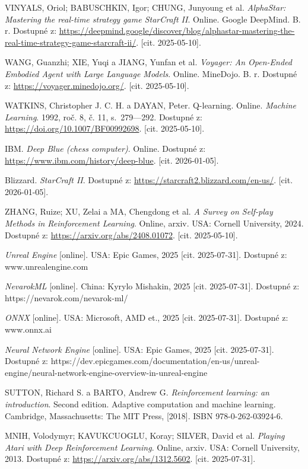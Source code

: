 VINYALS, Oriol; BABUSCHKIN, Igor; CHUNG, Junyoung et al. \textit{AlphaStar: Mastering the real-time strategy game StarCraft II}. Online. Google DeepMind. B. r. Dostupné z: \url{https://deepmind.google/discover/blog/alphastar-mastering-the-real-time-strategy-game-starcraft-ii/}. [cit. 2025-05-10].

WANG, Guanzhi; XIE, Yuqi a JIANG, Yunfan et al. \textit{Voyager: An Open-Ended Embodied Agent with Large Language Models}. Online. MineDojo. B. r. Dostupné z: \url{https://voyager.minedojo.org/}. [cit. 2025-05-10].

WATKINS, Christopher J. C. H. a DAYAN, Peter. Q-learning. Online. \textit{Machine Learning}. 1992, roč. 8, č. 11, s.~279---292. Dostupné z: \url{https://doi.org/10.1007/BF00992698}. [cit. 2025-05-10].

IBM. \textit{Deep Blue (chess computer)}. Online. Dostupné z: \url{https://www.ibm.com/history/deep-blue}. [cit. 2026-01-05].

Blizzard. \textit{StarCraft II}. Dostupné z: \url{https://starcraft2.blizzard.com/en-us/}. [cit. 2026-01-05].

ZHANG, Ruize; XU, Zelai a MA, Chengdong et al. \textit{A Survey on Self-play Methods in Reinforcement Learning}. Online, arxiv. USA: Cornell University, 2024. Dostupné z: \url{https://arxiv.org/abs/2408.01072}. [cit. 2025-05-10].

\textit{Unreal Engine} [online]. USA: Epic Games, 2025 [cit. 2025-07-31]. Dostupné z: www.unrealengine.com

\textit{NevarokML} [online]. China: Kyrylo Mishakin, 2025 [cit. 2025-07-31]. Dostupné z: https://nevarok.com/nevarok-ml/

\textit{ONNX} [online]. USA: Microsoft, AMD et., 2025 [cit. 2025-07-31]. Dostupné z: www.onnx.ai

\textit{Neural Network Engine} [online]. USA: Epic Games, 2025 [cit. 2025-07-31]. Dostupné z: https://dev.epicgames.com/documentation/en-us/unreal-engine/neural-network-engine-overview-in-unreal-engine

SUTTON, Richard S. a BARTO, Andrew G. \textit{Reinforcement learning: an introduction}. Second edition. Adaptive computation and machine learning. Cambridge, Massachusetts: The MIT Press, [2018]. ISBN 978-0-262-03924-6.

MNIH, Volodymyr; KAVUKCUOGLU, Koray; SILVER, David et al. \textit{Playing Atari with Deep Reinforcement Learning}. Online, arxiv. USA: Cornell University, 2013. Dostupné z: \url{https://arxiv.org/abs/1312.5602}. [cit. 2025-07-31].

